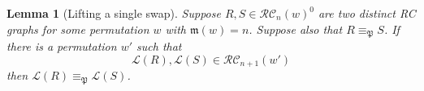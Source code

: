 \documentclass{amsart}
\newtheorem{lemma}{Lemma}[subsection]
\theoremstyle{definition}
\theoremstyle{remark}
\numberwithin{equation}{subsection}
\newcommand{\RC}{\mathcal{RC}}
\newcommand{\lmap}{\mathscr{L}}
\newcommand{\ltb}[2]{#1\!\uparrow_{#2}}
\newcommand{\forest}{\mathfrak{P}}
\newcommand{\maxd}{\mathfrak{m}}
\begin{document}
\begin{lemma}[Lifting a single swap]\label{lemma:forestsimple}
Suppose $R,S\in \RC_n(w)^0$ are two distinct RC graphs for some permutation $w$ with $\maxd(w)=n$. Suppose also that $R\equiv_\forest S$. If there is a permutation $w'$ such that
$$\lmap(R),\lmap(S)\in \RC_{n+1}(w')$$
then $\lmap(R)\equiv_\forest \lmap(S)$.
\end{lemma}
\end{document}
